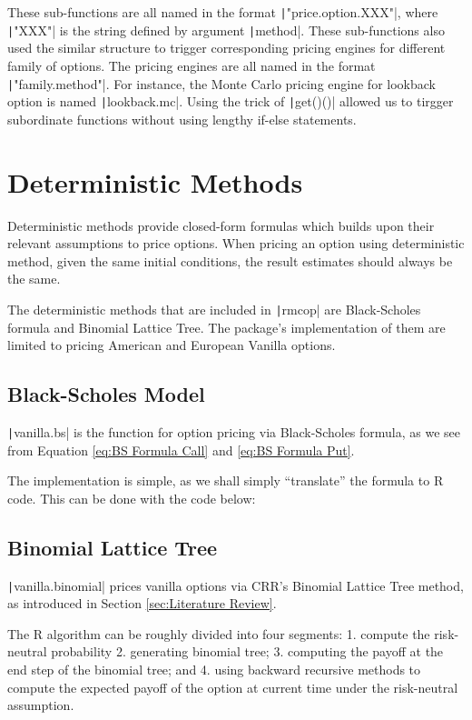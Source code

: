 These sub-functions are all named in the format \texttt|"price.option.XXX"|, where \texttt|"XXX"| is the string defined by argument \texttt|method|. These sub-functions also used the similar structure to trigger corresponding pricing engines for different family of options. The pricing engines are all named in the format \texttt|"family.method"|. For instance, the Monte Carlo pricing engine for lookback option is named \texttt|lookback.mc|. Using the trick of \texttt|get()()| allowed us to tirgger subordinate functions without using lengthy if-else statements.


\section{Deterministic Methods}

Deterministic methods provide closed-form formulas which builds upon their relevant assumptions to price options. When pricing an option using deterministic method, given the same initial conditions, the result estimates should always be the same.

The deterministic methods that are included in \texttt|rmcop| are Black-Scholes formula and Binomial Lattice Tree. The package's implementation of them are limited to pricing American and European Vanilla options.

\subsection{Black-Scholes Model}

\texttt|vanilla.bs| is the function for option pricing via Black-Scholes formula, as we see from Equation \ref{eq:BS Formula Call} and \ref{eq:BS Formula Put}.

The implementation is simple, as we shall simply ``translate'' the formula to R code. This can be done with the code below:

\subsection{Binomial Lattice Tree}

\texttt|vanilla.binomial| prices vanilla options via CRR's Binomial Lattice Tree method, as introduced in Section \ref{sec:Literature Review}.

The R algorithm can be roughly divided into four segments: 1. compute the risk-neutral probability 2. generating binomial tree; 3. computing the payoff at the end step of the binomial tree; and 4. using backward recursive methods to compute the expected payoff of the option at current time under the risk-neutral assumption.


